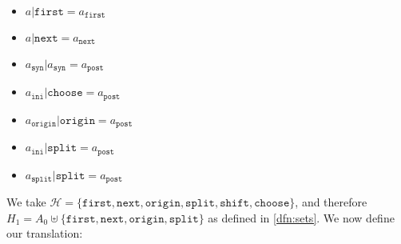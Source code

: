 \documentclass[../hons_project.tex]{subfiles}
\begin{document}
\begin{multicols}{3}
	\begin{itemize}[leftmargin=*]
		\item $a | \mathtt{first} = a_{\mathtt{first}}$
		\item $a | \mathtt{next} = a_{\mathtt{next}} $
		\item $a_{\mathtt{syn}} | a_{\mathtt{syn}} = a_{\mathtt{post}}$
		\item $a_{\mathtt{ini}} | \mathtt{choose} = a_{\mathtt{post}}$
		\item $a_{\mathtt{origin}} | \mathtt{origin} = a_{\mathtt{post}}$
		\item $a_{\mathtt{ini}} | \mathtt{split} = a_{\mathtt{post}}$
		\item $a_{\mathtt{split}} | \mathtt{split} = a_{\mathtt{post}}$
	\end{itemize}
\end{multicols}


We take $\mathscr{H} = \{\mathtt{first}, \mathtt{next}, \mathtt{origin}, \mathtt{split}, \mathtt{shift}, \mathtt{choose}\}$, and therefore $H_{1} = A_{0} \uplus \{\mathtt{first}, \mathtt{next}, \mathtt{origin}, \mathtt{split}\}$ as defined in \ref{dfn:sets}. We now define our translation:
\end{document}
